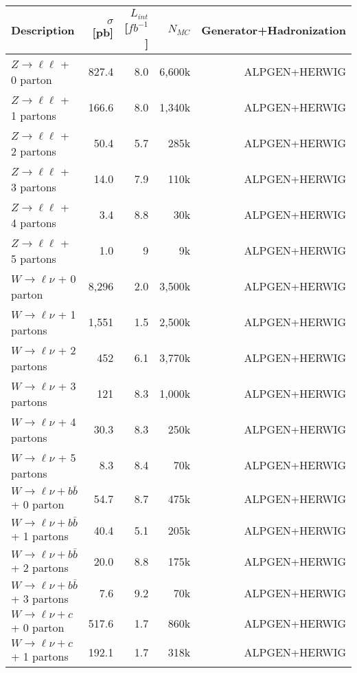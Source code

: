 \begin{table}[phtdp]
\begin{center}
\begin{tabular}{lrrrr}
\hline
 Description         & $\sigma$ [pb]  & $L_{int}$ [$fb^{-1}$] &  $N_{MC}$& Generator+Hadronization \\[1mm]
\hline \hline
$Z\to \ell\ell$ + 0 parton   & 827.4  &  8.0          &  6,600k & ALPGEN+HERWIG \\[1mm]     
$Z\to \ell\ell$ + 1 partons  & 166.6  &  8.0          &  1,340k & ALPGEN+HERWIG \\[1mm]     
$Z\to \ell\ell$ + 2 partons  & 50.4   &  5.7          &    285k & ALPGEN+HERWIG \\[1mm]     
$Z\to \ell\ell$ + 3 partons  & 14.0   &  7.9          &    110k & ALPGEN+HERWIG \\[1mm]  
$Z\to \ell\ell$ + 4 partons  & 3.4    &  8.8          &     30k & ALPGEN+HERWIG \\[1mm]  
$Z\to \ell\ell$ + 5 partons  & 1.0    &  9          &     9k & ALPGEN+HERWIG \\[1mm]  
\hline
$W\to \ell\nu$ + 0 parton   & 8,296   &  2.0         &  3,500k & ALPGEN+HERWIG \\[1mm]     
$W\to \ell\nu$ + 1 partons  & 1,551   &  1.5         &  2,500k & ALPGEN+HERWIG \\[1mm]     
$W\to \ell\nu$ + 2 partons  &   452   &  6.1         &  3,770k & ALPGEN+HERWIG \\[1mm]     
$W\to \ell\nu$ + 3 partons  &   121   &  8.3         &  1,000k & ALPGEN+HERWIG \\[1mm]  
$W\to \ell\nu$ + 4 partons  &  30.3   &  8.3         &    250k & ALPGEN+HERWIG \\[1mm]  
$W\to \ell\nu$ + 5 partons  &   8.3   &  8.4         &     70k & ALPGEN+HERWIG \\[1mm]  
\hline
$W\to \ell\nu+b\bar{b}$ + 0 parton   & 54.7  &  8.7  &    475k & ALPGEN+HERWIG \\[1mm]     
$W\to \ell\nu+b\bar{b}$ + 1 partons  & 40.4  &  5.1  &    205k & ALPGEN+HERWIG \\[1mm]     
$W\to \ell\nu+b\bar{b}$ + 2 partons  & 20.0  &  8.8  &    175k & ALPGEN+HERWIG \\[1mm]     
$W\to \ell\nu+b\bar{b}$ + 3 partons  & 7.6   &  9.2  &     70k & ALPGEN+HERWIG \\[1mm] \hline
\hline
$W\to \ell\nu+c$ + 0 parton   & 517.6 &  1.7   &  860k & ALPGEN+HERWIG \\[1mm]     
$W\to \ell\nu+c$ + 1 partons  & 192.1 &  1.7   &  318k & ALPGEN+HERWIG \\[1mm]     

\end{tabular}
\end{center}
\end{table}

